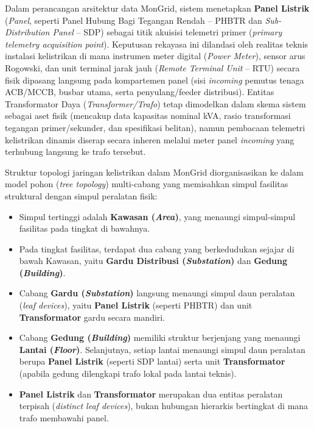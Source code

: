 Dalam perancangan arsitektur data MonGrid, sistem menetapkan \textbf{Panel Listrik} (\textit{Panel}, seperti Panel Hubung Bagi Tegangan Rendah -- PHBTR dan \textit{Sub-Distribution Panel} -- SDP) sebagai titik akuisisi telemetri primer (\textit{primary telemetry acquisition point}). Keputusan rekayasa ini dilandasi oleh realitas teknis instalasi kelistrikan di mana instrumen meter digital (\textit{Power Meter}), sensor arus Rogowski, dan unit terminal jarak jauh (\textit{Remote Terminal Unit} -- RTU) secara fisik dipasang langsung pada kompartemen panel (sisi \textit{incoming} pemutus tenaga ACB/MCCB, busbar utama, serta penyulang/feeder distribusi). Entitas Transformator Daya (\textit{Transformer/Trafo}) tetap dimodelkan dalam skema sistem sebagai aset fisik (mencakup data kapasitas nominal kVA, rasio transformasi tegangan primer/sekunder, dan spesifikasi belitan), namun pembacaan telemetri kelistrikan dinamis diserap secara inheren melalui meter panel \textit{incoming} yang terhubung langsung ke trafo tersebut.

Struktur topologi jaringan kelistrikan dalam MonGrid diorganisasikan ke dalam model pohon (\textit{tree topology}) multi-cabang yang memisahkan simpul fasilitas struktural dengan simpul peralatan fisik:
\begin{itemize}[leftmargin=*, itemsep=0pt]
  \item Simpul tertinggi adalah \textbf{Kawasan (\textit{Area})}, yang menaungi simpul-simpul fasilitas pada tingkat di bawahnya.
  \item Pada tingkat fasilitas, terdapat dua cabang yang berkedudukan sejajar di bawah Kawasan, yaitu \textbf{Gardu Distribusi (\textit{Substation})} dan \textbf{Gedung (\textit{Building})}.
  \item Cabang \textbf{Gardu (\textit{Substation})} langsung menaungi simpul daun peralatan (\textit{leaf devices}), yaitu \textbf{Panel Listrik} (seperti PHBTR) dan unit \textbf{Transformator} gardu secara mandiri.
  \item Cabang \textbf{Gedung (\textit{Building})} memiliki struktur berjenjang yang menaungi \textbf{Lantai (\textit{Floor})}. Selanjutnya, setiap lantai menaungi simpul daun peralatan berupa \textbf{Panel Listrik} (seperti SDP lantai) serta unit \textbf{Transformator} (apabila gedung dilengkapi trafo lokal pada lantai teknis).
  \item \textbf{Panel Listrik} dan \textbf{Transformator} merupakan dua entitas peralatan terpisah (\textit{distinct leaf devices}), bukan hubungan hierarkis bertingkat di mana trafo membawahi panel.
\end{itemize}

